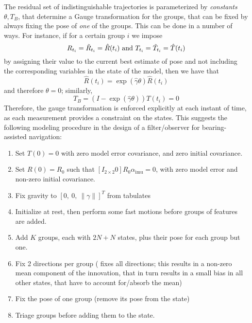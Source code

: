 \documentclass[]{article}
\def\imu{_\mathrm{imu}}
\begin{document}
The residual set of indistinguishable trajectories is parameterized by {\em constants} $\theta, T_B$, that determine a Gauge transformation for the groups, that can be fixed by always fixing the pose of {\em one} of the groups. This can be done in a number of ways. For instance, if for a certain group $i$ we impose
\begin{equation}
R_{t_i}  = \tilde R_{t_i} = \hat R(t_i) \ {\rm and} \ T_{t_i}  = \tilde T_{t_i} = \hat T(t_i)
\end{equation}
by assigning their value to the current best estimate of pose and not including the corresponding variables in the state of the model, then we have that
\begin{equation}
\hat R(t_i) = \exp(\widehat \gamma \theta) \hat R(t_i) 
\end{equation}
and therefore $\theta = 0$; similarly, 
\begin{equation}
T_B = (I - \exp(\widehat \gamma \theta))T(t_i) = 0
\end{equation}
 Therefore, the gauge transformation is enforced explicitly at each instant of time, as each measurement provides a constraint on the states. This suggests the following modeling procedure in the design of a filter/observer for bearing-assisted navigation:
\begin{enumerate}
\item Set $T(0) = 0$ with zero model error covariance, and zero initial covariance.
\item Set $R(0) = R_0$ such that $[I_{2\times 2} 0]R_0 \alpha\imu  = 0$, with zero model error and non-zero initial covariance.
\item Fix gravity to $[0, \ 0, \ \| \gamma \|]^T$ from tabulates
\item Initialize at rest, then perform some fast motions before groups of features are added.
\item Add $K$ groups, each with $2N + N$ states, plus their pose for each group but one. 
\item Fix 2 directions per group (\cite{jonesS09} fixes all directions; this results in a non-zero mean component of the innovation, that in turn results in a small bias in all other states, that have to account for/absorb the mean)
\item Fix the pose of one group (remove its pose from the state)
\item Triage groups before adding them to the state. 
\end{enumerate}
\end{document}
